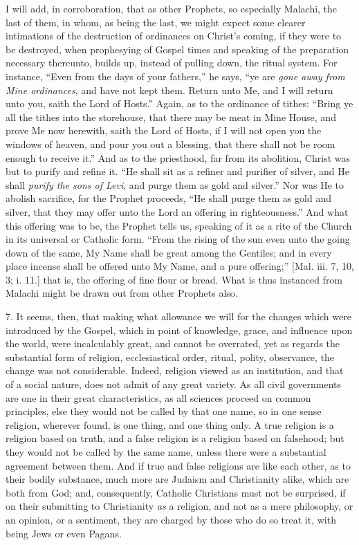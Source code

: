 I will add, in corroboration, that as other Prophets, so especially
Malachi, the last of them, in whom, as being the last, we might expect
some clearer intimations of the destruction of ordinances on Christ's
coming, if they were to be destroyed, when prophesying of Gospel times
and speaking of the preparation necessary thereunto, builds up,
instead of pulling down, the ritual system. For instance, ``Even
from the days of your fathers,'' he says, ``ye are \emph{gone
away from Mine ordinances}, and have not kept them. Return unto Me,
and I will return unto you, saith the Lord of Hosts.'' Again, as
to the ordinance of tithes: ``Bring ye all the tithes into the
storehouse, that there may be meat in Mine House, and prove Me now
herewith, saith the Lord of Hosts, if I will not open you the windows
of heaven, and pour you out a blessing, that there shall not be room
enough to receive it.'' And as to the priesthood, far from its
abolition, Christ was but to purify and refine it. ``He shall sit
as a refiner and purifier of silver, and He shall \emph{purify the sons
of Levi}, and purge them as gold and silver.'' Nor was He to
abolish sacrifice, for the Prophet proceeds, ``He shall purge them
as gold and silver, that they may offer unto the Lord an offering in
righteousness.'' And what this offering was to be, the Prophet
tells us, speaking of it as a rite of the Church in its universal or
Catholic form. ``From the rising of the sun even unto the going
down of the same, My Name shall be great among the Gentiles; and in
every place incense shall be offered unto My Name, and a pure
offering;'' [Mal. iii. 7, 10, 3; i. 11.] that is, the offering of
fine flour or bread. What is thus instanced from Malachi might be
drawn out from other Prophets also.

7. It seems, then, that making what allowance we will for the
changes which were introduced by the Gospel, which in point of
knowledge, grace, and influence upon the world, were incalculably
great, and cannot be overrated, yet as regards the substantial form of
religion, ecclesiastical order, ritual, polity, observance, the change
was not considerable. Indeed, religion viewed as an institution, and
that of a social nature, does not admit of any great variety. As all
civil governments are one in their great characteristics, as all
sciences proceed on common principles, else they would not be called
by that one name, so in one sense religion, wherever found, is one
thing, and one thing only. A true religion is a religion based on
truth, and a false religion is a religion based on falsehood; but they
would not be called by the same name, unless there were a substantial
agreement between them. And if true and false religions are like each
other, as to their bodily substance, much more are Judaism and
Christianity alike, which are both from God; and, consequently,
Catholic Christians must not be surprised, if on their submitting to
Christianity \emph{as} a religion, and not as a mere philosophy, or an
opinion, or a sentiment, they are charged by those who do so treat it,
with being Jews or even Pagans.

